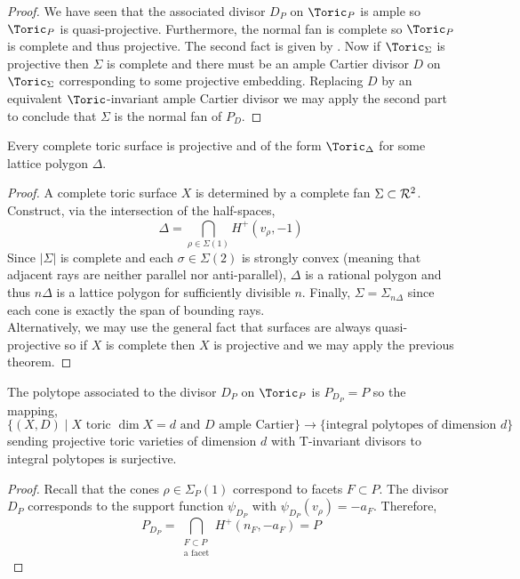 \begin{proof}
We have seen that the associated divisor $D_P$ on $\Toric_P$ is ample so $\Toric_P$ is quasi-projective. Furthermore, the normal fan is complete so $\Toric_P$ is complete and thus projective. The second fact is given by \cite[Thm. 7.2.3]{cox}. Now if $\Toric_\Sigma$ is projective then $\Sigma$ is complete and there must be an ample Cartier divisor $D$ on $\Toric_\Sigma$ corresponding to some projective embedding. Replacing $D$ by an equivalent $\Toric$-invariant ample Cartier divisor we may apply the second part to conclude that $\Sigma$ is the normal fan of $P_D$. 
\end{proof}

\begin{prop} \label{toric_surfaces_projective}
Every complete toric surface is projective and of the form $\Toric_{\Delta}$ for some lattice polygon $\Delta$. 
\end{prop}

\begin{proof}
A complete toric surface $X$ is determined by a complete fan $\Sigma \subset \mathcal{R}^2$. Construct, via the intersection of the half-spaces,
\[ \Delta = \bigcap_{\rho \in \Sigma(1)} H^+(v_\rho, -1) \]
Since $|\Sigma|$ is complete and each $\sigma \in \Sigma(2)$ is strongly convex (meaning that adjacent rays are neither parallel nor anti-parallel), $\Delta$ is a rational polygon and thus $n \Delta$ is a lattice polygon for sufficiently divisible $n$. Finally, $\Sigma = \Sigma_{n \Delta}$ since each cone is exactly the span of bounding rays.
\bigskip\\
Alternatively, we may use the general fact that surfaces are always quasi-projective \cite[\href{https://stacks.math.columbia.edu/tag/0C5N}{Tag 0C5N}]{stacks-project} so if $X$ is complete then $X$ is projective and we may apply the previous theorem. 
\end{proof}

\begin{theorem}
The polytope associated to the divisor $D_P$ on $\Toric_P$ is $P_{D_P} = P$ so the mapping,
\[ \{ (X, D) \mid X \text{ toric } \dim{X} = d \text{ and  } D \text{ ample Cartier} \} \to \{ \text{integral polytopes of dimension } d \} \]
sending projective toric varieties of dimension $d$ with T-invariant divisors to integral polytopes is surjective. 
\end{theorem}

\begin{proof}
Recall that the cones $\rho \in \Sigma_P(1)$ correspond to facets $F \subset P$. 
The divisor $D_P$ corresponds to the support function $\psi_{D_P}$ with $\psi_{D_P}(v_\rho) = - a_F$. Therefore,
\[ P_{D_P} = \bigcap_{\substack{F \subset P \\ \text{a facet}}} H^+(n_F, - a_F) = P \]
\end{proof}

